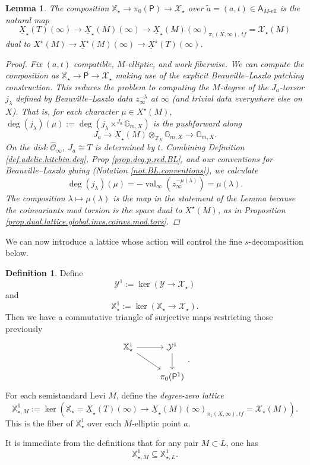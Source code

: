 \documentclass[openany]{amsbook}
\newtheorem{lemma}[theorem]{Lemma}
\theoremstyle{definition}
\newtheorem{definition}[theorem]{Definition}
\theoremstyle{remark}
\numberwithin{equation}{section}
\newcommand{\Z}{\mathbb{Z}}
\newcommand{\G}{\mathbb{G}}
\renewcommand{\O}{\mathcal{O}}
\newcommand{\cX}{\mathcal{X}}
\newcommand{\cY}{\mathcal{Y}}
\newcommand{\ul}[1]{\underline{#1}}
\newcommand{\val}{\on{val}}
\renewcommand{\-}{\operatorname{-}}
\newcommand{\on}[1]{\operatorname{#1}}
\newcommand{\wtilde}[1]{\widetilde{#1}}
\newcommand{\el}{\text{-ell}}
\newcommand{\bA}{\mathsf{A}}
\newcommand{\bX}{\mathbb{X}}
\newcommand{\bAe}[1]{\bA_{#1\el}}
\newcommand{\bP}{\mathsf{P}}
\newcommand{\tf}{\mathit{tf}}
\begin{document}
\begin{lemma}\label{lem.compos.deg.pic}
    The composition $\bX_\star \to \pi_0(\bP) \to \cX_\star$ over $\wtilde{a} = (a,t) \in \bAe{M}$ is the natural map
    $$
        \ul{X}_\star(T)(\infty) \to \ul{X}_\star(M)(\infty) \to \ul{X}_\star(M)(\infty)_{\pi_1(X, \infty), \,\tf} = \cX_\star(M)
    $$
    dual to $X^\star(M) \to \ul{X}^\star(M)(\infty) \to \ul{X}^\star(T)(\infty)$.
    \begin{proof}
        Fix $(a,t)$ compatible, $M$-elliptic, and work fiberwise. We can compute the composition as $\bX_\star \to \bP \to \cX_\star$ making use of the explicit Beauville--Laszlo patching construction. This reduces the problem to computing the $M$-degree of the $J_a$-torsor $j_\lambda$ defined by Beauville--Laszlo data $z_{\infty}^{-\lambda}$ at $\infty$ (and trivial data everywhere else on $X$). That is, for each character $\mu \in X^\star(M)$, $\deg(j_\lambda)(\mu) := \deg(j_\lambda \times^{J_a} \G_{m,X})$ is the pushforward along
        $$
            J_a \to \ul{X}_\star(M) \otimes_{\Z_X} \G_{m,X} \to \G_{m,X}.
        $$
        On the disk $\widehat{\O}_{\infty}$, $J_a \cong T$ is determined by $t$. Combining Definition \ref{def.adelic.hitchin.deg}, Prop \ref{prop.deg.p.red.BL}, and our conventions for Beauville--Laszlo gluing (Notation \ref{not.BL.conventions}), we calculate 
        $$\deg(j_\lambda)(\mu) = -\val_{\infty}(z_\infty^{-\mu(\lambda)}) = \mu(\lambda).$$ The composition $\lambda \mapsto \mu(\lambda)$ is the map in the statement of the Lemma because the coinvariants mod torsion is the space dual to $X^\star(M)$, as in Proposition \ref{prop.dual.lattice.global.invs.coinvs.mod.tors}.
    \end{proof}
\end{lemma}



We can now introduce a lattice whose action will control the fine $s$-decomposition below.
\begin{definition}
    Define 
    $$
        \cY^1 := \ker(\cY \to \cX_\star)
    $$
    and 
    $$
        \bX_\star^1 := \ker(\bX_\star \to \cX_\star).
    $$
    Then we have a commutative triangle of surjective maps restricting those previously
    $$
        \begin{tikzcd}[ampersand replacement=\&]
            \bX_\star^1 \ar[r] \ar[dr] \& \cY^1 \ar[d] \\
            \& \pi_0(\bP^{1})
        \end{tikzcd}.
    $$
    For each semistandard Levi $M$, define the \emph{degree-zero lattice} $$\bX_{\star,M}^1 := \ker(\bX_\star = \ul{X}_\star(T)(\infty) \to \ul{X}_\star(M)(\infty)_{\pi_1(X, \infty), \tf} = \cX_\star(M)).$$ This is the fiber of $\bX_\star^1$ over each $M$-elliptic point $a$.
\end{definition}
It is immediate from the definitions that for any pair $M \subset L$, one has 
$$
    \bX_{\star,M}^1 \subseteq \bX_{\star,L}^1.
$$
\end{document}
